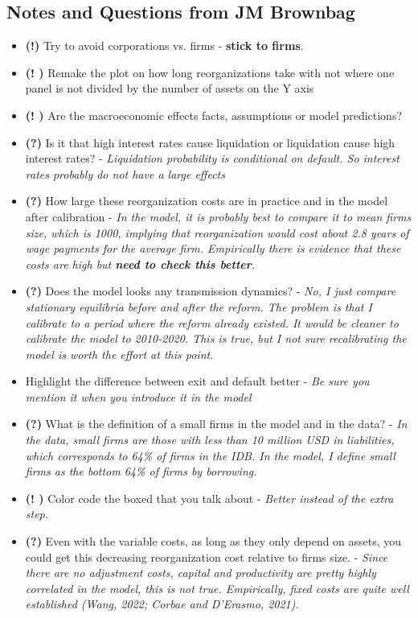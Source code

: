 \documentclass[12pt]{article}
\begin{document}
\subsection*{Notes and Questions from JM Brownbag}
\begin{itemize} \setlength\itemsep{0em}  \small
    \item \textbf{(!)} Try to avoid corporations vs. firms - \textbf{stick to firms}. 
    \item \textbf{(! \checkmark)} Remake the plot on how long reorganizations take with not where one panel is not divided by the number of assets on the Y axis
    \item \textbf{(! \checkmark)} Are the macroeconomic effects facts, assumptions or model predictions? 
    \item \textbf{(?)} Is it that high interest rates cause liquidation or liquidation cause high interest rates? - \textit{Liquidation probability is conditional on default. So interest rates probably do not have a large effects}
    \item \textbf{(?)} How large these reorganization costs are in practice and in the model after calibration  - \textit{In the model, it is probably best to compare it to mean firms size, which is 1000, implying that reorganization would cost about 2.8 years of wage payments for the average firm. Empirically there is evidence that these costs are high but \textbf{need to check this better}.}
    \item \textbf{(?)} Does the model looks any transmission dynamics? - \textit{No, I just compare stationary equilibria before and after the reform. The problem is that I calibrate to a period where the reform already existed. It would be cleaner to calibrate the model to 2010-2020. This is true, but I not sure recalibrating the model is worth the effort at this point.}
    \item Highlight the difference between exit and default better - \textit{Be sure you mention it when you introduce it in the model}
    \item \textbf{(?)} What is the definition of a small firms in the model and in the data? - \textit{In the data, small firms are those with less than 10 million USD in liabilities, which corresponds to 64\% of firms in the IDB. In the model, I define small firms as the bottom 64\% of firms by borrowing.}
    \item \textbf{(! \checkmark)} Color code the boxed that you talk about - \textit{Better instead of the extra step.}
    \item \textbf{(?)} Even with the variable costs, as long as they only depend on assets, you could get this decreasing reorganization cost relative to firms size. - \textit{Since there are no adjustment costs, capital and productivity are pretty highly correlated in the model, this is not true. Empirically, fixed costs are quite well established (Wang, 2022; Corbae and D'Erasmo, 2021).}

\end{itemize}
\end{document}
